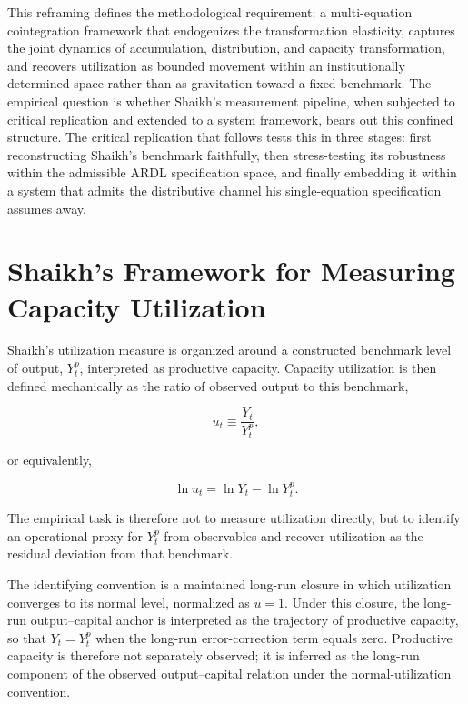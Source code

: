 \documentclass[11pt,a4paper]{article}
\begin{document}
This reframing defines the methodological requirement: a multi-equation
cointegration framework that endogenizes the transformation elasticity,
captures the joint dynamics of accumulation, distribution, and capacity
transformation, and recovers utilization as bounded movement within an
institutionally determined space rather than as gravitation toward a fixed
benchmark. The empirical question is whether Shaikh's measurement pipeline,
when subjected to critical replication and extended to a system framework,
bears out this confined structure. The critical replication that follows
tests this in three stages: first reconstructing Shaikh's benchmark
faithfully, then stress-testing its robustness within the admissible ARDL
specification space, and finally embedding it within a system that admits the
distributive channel his single-equation specification assumes away.



\section{Shaikh's Framework for Measuring Capacity Utilization}

Shaikh's utilization measure is organized around a constructed benchmark level of output,
\( Y_t^p \), interpreted as productive capacity. Capacity utilization is then defined
mechanically as the ratio of observed output to this benchmark,

\begin{equation}
	u_t \equiv \frac{Y_t}{Y_t^p},
\end{equation}

or equivalently,

\begin{equation}
	\ln u_t = \ln Y_t - \ln Y_t^p .
\end{equation}

The empirical task is therefore not to measure utilization directly, but to identify
an operational proxy for \( Y_t^p \) from observables and recover utilization as the
residual deviation from that benchmark.

The identifying convention is a maintained long-run closure in which utilization
converges to its normal level, normalized as \( u = 1 \). Under this closure, the
long-run output--capital anchor is interpreted as the trajectory of productive
capacity, so that \( Y_t = Y_t^p \) when the long-run error-correction term equals
zero. Productive capacity is therefore not separately observed; it is inferred as
the long-run component of the observed output--capital relation under the
normal-utilization convention.
\end{document}
